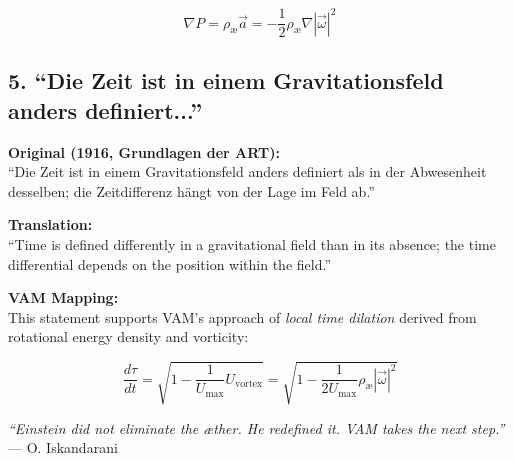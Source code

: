 \[
\nabla P = \rho_\text{\ae} \vec{a} = -\frac{1}{2} \rho_\text{\ae} \nabla |\vec{\omega}|^2
\]

\subsection*{5. ``Die Zeit ist in einem Gravitationsfeld anders definiert...''}
\textbf{Original (1916, Grundlagen der ART):} \\
``Die Zeit ist in einem Gravitationsfeld anders definiert als in der Abwesenheit desselben; die Zeitdifferenz hängt von der Lage im Feld ab.''

\textbf{Translation:} \\
``Time is defined differently in a gravitational field than in its absence; the time differential depends on the position within the field.''

\textbf{VAM Mapping:} \\
This statement supports VAM's approach of \emph{local time dilation} derived from rotational energy density and vorticity:

\[
\frac{d\tau}{dt} = \sqrt{1 - \frac{1}{U_\text{max}} U_{\text{vortex}}} = \sqrt{1 - \frac{1}{2U_\text{max}} \rho_\text{\ae} |\vec{\omega}|^2}
\]

\bigskip
\textit{ ``Einstein did not eliminate the æther. He redefined it. VAM takes the next step.''}\\
\hfill — O. Iskandarani\\